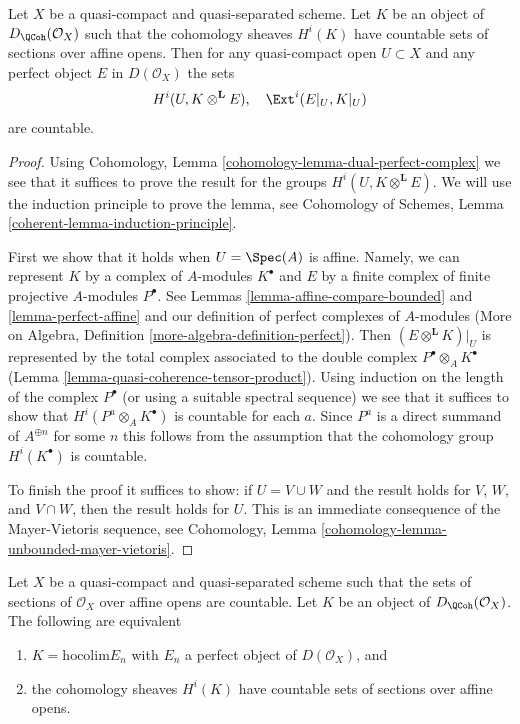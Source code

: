 \begin{lemma}
\label{lemma-countable-cohomology}
Let $X$ be a quasi-compact and quasi-separated scheme.
Let $K$ be an object of $D_\QCoh(\mathcal{O}_X)$
such that the cohomology sheaves $H^i(K)$ have countable
sets of sections over affine opens. Then for any quasi-compact open
$U \subset X$ and any perfect object $E$ in $D(\mathcal{O}_X)$
the sets
$$
H^i(U, K \otimes^\mathbf{L} E),\quad \Ext^i(E|_U, K|_U)
$$
are countable.
\end{lemma}

\begin{proof}
Using Cohomology, Lemma \ref{cohomology-lemma-dual-perfect-complex}
we see that it suffices to prove the result
for the groups $H^i(U, K \otimes^\mathbf{L} E)$.
We will use the induction principle to prove the lemma, see
Cohomology of Schemes, Lemma \ref{coherent-lemma-induction-principle}.

\medskip\noindent
First we show that it holds when $U = \Spec(A)$ is affine. Namely, we can
represent $K$ by a complex of $A$-modules $K^\bullet$ and $E$ by a
finite complex of finite projective $A$-modules $P^\bullet$.
See Lemmas \ref{lemma-affine-compare-bounded} and
\ref{lemma-perfect-affine}
and our definition of perfect complexes of $A$-modules
(More on Algebra, Definition \ref{more-algebra-definition-perfect}).
Then $(E \otimes^\mathbf{L} K)|_U$ is represented by
the total complex associated to the double complex
$P^\bullet \otimes_A K^\bullet$
(Lemma \ref{lemma-quasi-coherence-tensor-product}).
Using induction on the length of the complex
$P^\bullet$ (or using a suitable spectral sequence)
we see that it suffices to show that
$H^i(P^a \otimes_A K^\bullet)$ is countable for each $a$.
Since $P^a$ is a direct summand of $A^{\oplus n}$ for
some $n$ this follows from the assumption that
the cohomology group $H^i(K^\bullet)$ is countable.

\medskip\noindent
To finish the proof it suffices to show: if $U = V \cup W$
and the result holds for $V$, $W$, and $V \cap W$, then
the result holds for $U$. This is an immediate consequence
of the Mayer-Vietoris sequence, see
Cohomology, Lemma \ref{cohomology-lemma-unbounded-mayer-vietoris}.
\end{proof}

\begin{lemma}
\label{lemma-countable}
Let $X$ be a quasi-compact and quasi-separated scheme such that
the sets of sections of $\mathcal{O}_X$ over affine opens are countable.
Let $K$ be an object of $D_\QCoh(\mathcal{O}_X)$. The
following are equivalent
\begin{enumerate}
\item $K = \text{hocolim} E_n$ with $E_n$ a perfect object of
$D(\mathcal{O}_X)$, and
\item the cohomology sheaves $H^i(K)$ have countable
sets of sections over affine opens.
\end{enumerate}
\end{lemma}

